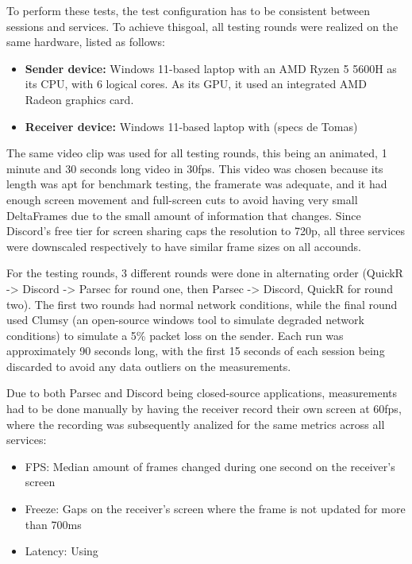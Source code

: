 \documentclass{article}
\begin{document}
To perform these tests, the test configuration has to be consistent between sessions and services. To achieve thisgoal, all testing rounds were realized on the same hardware, listed as follows:
\begin{itemize}
    \item \textbf{Sender device: } Windows 11-based laptop with an AMD Ryzen 5 5600H as its CPU, with 6 logical cores. As its GPU, it used an integrated AMD Radeon graphics card.
    \item \textbf{Receiver device: } Windows 11-based laptop with (specs de Tomas)
\end{itemize}
The same video clip was used for all testing rounds, this being an animated, 1 minute and 30 seconds long video in 30fps. This video was chosen because its length was apt for benchmark testing, the framerate was adequate, and it had enough screen movement and full-screen cuts to avoid having very small DeltaFrames due to the small amount of information that changes. Since Discord's free tier for screen sharing caps the resolution to 720p, all three services were downscaled respectively to have similar frame sizes on all accounds.

For the testing rounds, 3 different rounds were done in alternating order (QuickR -> Discord -> Parsec for round one, then Parsec -> Discord, QuickR for round two). The first two rounds had normal network conditions, while the final round used Clumsy (an open-source windows tool to simulate degraded network conditions) to simulate a 5\% packet loss on the sender. Each run was approximately 90 seconds long, with the first 15 seconds of each session being discarded to avoid any data outliers on the measurements.

Due to both Parsec and Discord being closed-source applications, measurements had to be done manually by having the receiver record their own screen at 60fps, where the recording was subsequently analized for the same metrics across all services:
\begin{itemize}
    \item FPS: Median amount of frames changed during one second on the receiver's screen
    \item Freeze: Gaps on the receiver's screen where the frame is not updated for more than 700ms
    \item Latency: Using 
\end{itemize}
\end{document}

